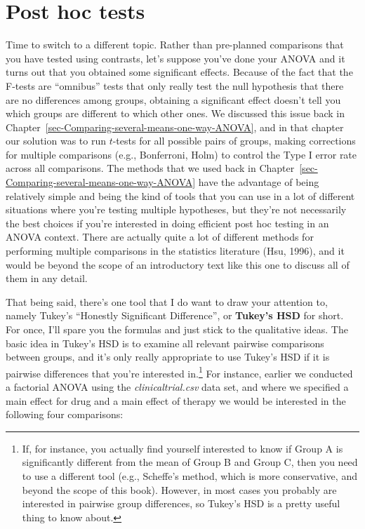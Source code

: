 \documentclass[
  a4paper,
]{book}
\begin{document}
\hypertarget{sec-Post-hoc-tests}{%
\section{Post hoc tests}\label{sec-Post-hoc-tests}}

Time to switch to a different topic. Rather than pre-planned comparisons
that you have tested using contrasts, let's suppose you've done your
ANOVA and it turns out that you obtained some significant effects.
Because of the fact that the F-tests are ``omnibus'' tests that only
really test the null hypothesis that there are no differences among
groups, obtaining a significant effect doesn't tell you which groups are
different to which other ones. We discussed this issue back in
Chapter~\ref{sec-Comparing-several-means-one-way-ANOVA}, and in that
chapter our solution was to run \(t\)-tests for all possible pairs of
groups, making corrections for multiple comparisons (e.g., Bonferroni,
Holm) to control the Type I error rate across all comparisons. The
methods that we used back in
Chapter~\ref{sec-Comparing-several-means-one-way-ANOVA} have the
advantage of being relatively simple and being the kind of tools that
you can use in a lot of different situations where you're testing
multiple hypotheses, but they're not necessarily the best choices if
you're interested in doing efficient post hoc testing in an ANOVA
context. There are actually quite a lot of different methods for
performing multiple comparisons in the statistics literature (Hsu,
1996), and it would be beyond the scope of an introductory text like
this one to discuss all of them in any detail.

That being said, there's one tool that I do want to draw your attention
to, namely Tukey's ``Honestly Significant Difference'', or
\textbf{Tukey's HSD} for short. For once, I'll spare you the formulas
and just stick to the qualitative ideas. The basic idea in Tukey's HSD
is to examine all relevant pairwise comparisons between groups, and it's
only really appropriate to use Tukey's HSD if it is pairwise differences
that you're interested in.\footnote{If, for instance, you actually find
  yourself interested to know if Group A is significantly different from
  the mean of Group B and Group C, then you need to use a different tool
  (e.g., Scheffe's method, which is more conservative, and beyond the
  scope of this book). However, in most cases you probably are
  interested in pairwise group differences, so Tukey's HSD is a pretty
  useful thing to know about.} For instance, earlier we conducted a
factorial ANOVA using the \emph{clinicaltrial.csv} data set, and where
we specified a main effect for drug and a main effect of therapy we
would be interested in the following four comparisons:
\end{document}
